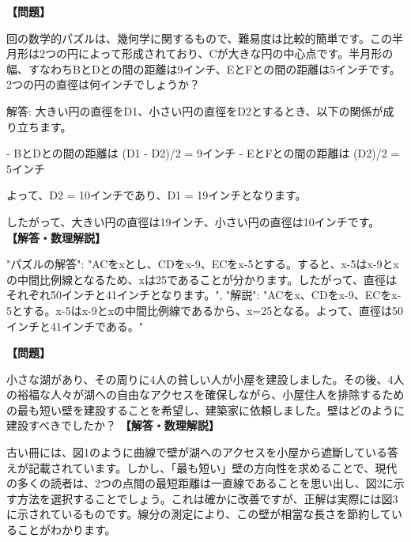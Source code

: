 \documentclass[10pt,a4paper,oneside,openany]{ltjsbook}
\begin{document}
\begin{tcolorbox}[colback=softblue,colframe=primaryblue,title=\textbf{第 191 問：THE CRESCENT PUZZLE.},arc=2mm,boxrule=1pt,breakable]
\textbf{【問題】}\par\vspace{0.3em}
回の数学的パズルは、幾何学に関するもので、難易度は比較的簡単です。この半月形は2つの円によって形成されており、Cが大きな円の中心点です。半月形の幅、すなわちBとDとの間の距離は9インチ、EとFとの間の距離は5インチです。2つの円の直徑は何インチでしょうか？

解答:
大きい円の直徑をD1、小さい円の直徑をD2とするとき、以下の関係が成り立ちます。

- BとDとの間の距離は (D1 - D2)/2 = 9インチ
- EとFとの間の距離は (D2)/2 = 5インチ

よって、D2 = 10インチであり、D1 = 19インチとなります。

したがって、大きい円の直徑は19インチ、小さい円の直徑は10インチです。
\tcblower
\textbf{【解答・数理解説】}\par\vspace{0.3em}
{
"パズルの解答": "ACをxとし、CDをx-9、ECをx-5とする。すると、x-5はx-9とxの中間比例線となるため、xは25であることが分かります。したがって、直徑はそれぞれ50インチと41インチとなります。",
"解説": "ACをx、CDをx-9、ECをx-5とする。x-5はx-9とxの中間比例線であるから、x=25となる。よって、直徑は50インチと41インチである。"
}
\end{tcolorbox}

\begin{tcolorbox}[colback=softblue,colframe=primaryblue,title=\textbf{第 192 問：迷路の壁 （原題: THE PUZZLE WALL.）},arc=2mm,boxrule=1pt,breakable]
\textbf{【問題】}\par\vspace{0.3em}
小さな湖があり、その周りに4人の貧しい人が小屋を建設しました。その後、4人の裕福な人々が湖への自由なアクセスを確保しながら、小屋住人を排除するための最も短い壁を建設することを希望し、建築家に依頼しました。壁はどのように建設すべきでしたか？
\tcblower
\textbf{【解答・数理解説】}\par\vspace{0.3em}
古い冊には、図1のように曲線で壁が湖へのアクセスを小屋から遮斷している答えが記載されています。しかし、「最も短い」壁の方向性を求めることで、現代の多くの読者は、2つの点間の最短距離は一直線であることを思い出し、図2に示す方法を選択することでしょう。これは確かに改善ですが、正解は実際には図3に示されているものです。線分の測定により、この壁が相當な長さを節約していることがわかります。
\end{tcolorbox}
\end{document}
